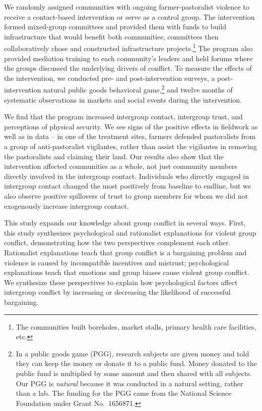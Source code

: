 \documentclass[11pt]{article}
\begin{document}
We randomly assigned communities with ongoing farmer-pastoralist
violence to receive a contact-based intervention or serve as a control
group. The intervention formed mixed-group committees and provided them
with funds to build infrastructure that would benefit both communities;
committees then collaboratively chose and constructed infrastructure
projects.\footnote{The communities built boreholes, market stalls,
  primary health care facilities, etc.} The program also provided
mediation training to each community's leaders and held forums where the
groups discussed the underlying drivers of conflict. To measure the
effects of the intervention, we conducted pre- and post-intervention
surveys, a post-intervention natural public goods behavioral
game,\footnote{In a public goods game (PGG), research subjects are given
  money and told they can keep the money or donate it to a public fund.
  Money donated to the public fund is multiplied by some amount and then
  shared with all subjects. Our PGG is \emph{natural} because it was
  conducted in a natural setting, rather than a lab. The funding for the
  PGG came from the National Science Foundation under Grant No.~1656871.}
and twelve months of systematic observations in markets and social
events during the intervention.

We find that the program increased intergroup contact, intergroup trust,
and perceptions of physical security. We see signs of the positive
effects in fieldwork as well as in data -- in one of the treatment
sites, farmers defended pastoralists from a group of anti-pastoralist
vigilantes, rather than assist the vigilantes in removing the
pastoralists and claiming their land. Our results also show that the
intervention affected communities as a whole, not just community members
directly involved in the intergroup contact. Individuals who directly
engaged in intergroup contact changed the most positively from baseline
to endline, but we also observe positive spillovers of trust to group
members for whom we did not exogenously increase intergroup contact.

This study expands our knowledge about group conflict in several ways.
First, this study synthesizes psychological and rationalist explanations
for violent group conflict, demonstrating how the two perspectives
complement each other. Rationalist explanations teach that group
conflict is a bargaining problem and violence is caused by incompatible
incentives and mistrust; psychological explanations teach that emotions
and group biases cause violent group conflict. We synthesize these
perspectives to explain how psychological factors affect intergroup
conflict by increasing or decreasing the likelihood of successful
bargaining.
\end{document}
